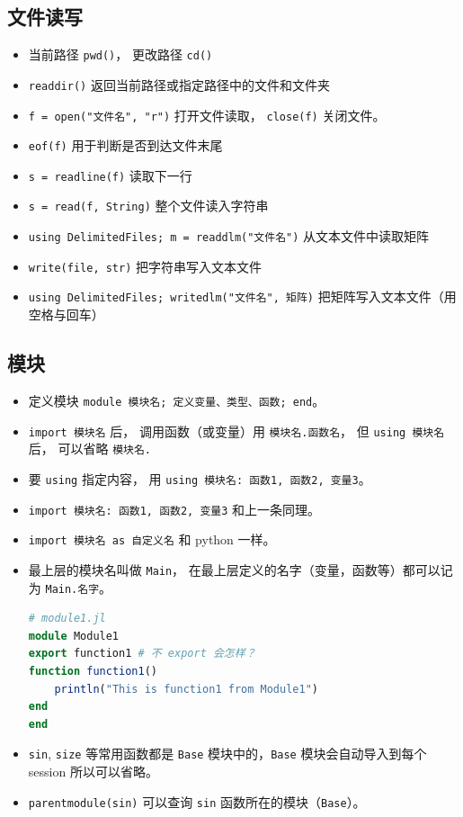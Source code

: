 \subsection{文件读写}
\begin{itemize}
\item 当前路径 \verb`pwd()`， 更改路径 \verb`cd()`
\item \verb`readdir()` 返回当前路径或指定路径中的文件和文件夹
\item \verb`f = open("文件名", "r")` 打开文件读取， \verb`close(f)` 关闭文件。
\item \verb`eof(f)` 用于判断是否到达文件末尾
\item \verb`s = readline(f)` 读取下一行
\item \verb`s = read(f, String)` 整个文件读入字符串
\item \verb`using DelimitedFiles; m = readdlm("文件名")` 从文本文件中读取矩阵
\item \verb`write(file, str)` 把字符串写入文本文件
\item \verb`using DelimitedFiles; writedlm("文件名", 矩阵)` 把矩阵写入文本文件（用空格与回车）
\end{itemize}


\subsection{模块}
\begin{itemize}
\item 定义模块 \verb`module 模块名; 定义变量、类型、函数; end`。
\item \verb`import 模块名` 后， 调用函数（或变量）用 \verb`模块名.函数名`， 但 \verb`using 模块名` 后， 可以省略 \verb`模块名.`
\item 要 \verb`using` 指定内容， 用 \verb`using 模块名: 函数1, 函数2, 变量3`。
\item \verb`import 模块名: 函数1, 函数2, 变量3` 和上一条同理。
\item \verb`import 模块名 as 自定义名` 和 python 一样。
\item 最上层的模块名叫做 \verb`Main`， 在最上层定义的名字（变量，函数等）都可以记为 \verb`Main.名字`。
\begin{lstlisting}[language=julia]
# module1.jl
module Module1
export function1 # 不 export 会怎样？
function function1()
    println("This is function1 from Module1")
end
end
\end{lstlisting}
\item \verb`sin`, \verb`size` 等常用函数都是 \verb`Base` 模块中的，\verb`Base` 模块会自动导入到每个 session 所以可以省略。
\item \verb`parentmodule(sin)` 可以查询 \verb`sin` 函数所在的模块（\verb`Base`）。
\end{itemize}




